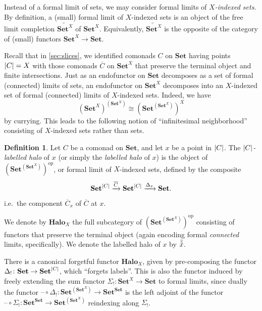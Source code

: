\documentclass[11pt, oneside, article]{memoir}
\theoremstyle{plain}
\theoremstyle{definition}
\newtheorem{definition}[def]{Definition}
\theoremstyle{remark}
\DeclareMathOperator{\ophelper}{op}
\DeclarePairedDelimiter{\abs}{\lvert}{\rvert}
\newcommand{\dash}{{\mathord{\text{--}}}}
\newcommand{\op}{^{\ophelper}}
\newcommand{\xto}[1]{\xrightarrow{#1}}
\newcommand{\bang}{\mathrm{!}}
\newcommand{\namedcat}[1]{\mathbf{#1}}
\newcommand{\Halo}{\namedcat{Halo}}
\newcommand{\LHalo}[1]{\Halo_{#1}}
\newcommand{\Set}{\namedcat{Set}}
\newcommand{\clift}[1]{\overline{#1}}
\newcommand{\pts}[1]{{\abs{#1}}}
\newcommand{\lhalo}[1]{\accentset{\overline{\circ}}{#1}}
\newcommand{\reindex}[1]{\Delta_{#1}}
\newcommand{\slicel}{\Sigma_\bang}
\newcommand{\slicer}{\Delta_\bang}
\newcommand{\fun}[2]{{#2}^{#1}}
\newcommand{\End}[1]{\fun{#1}{#1}}
\newcommand{\SetSet}{\End{\Set}}
\newcommand{\cmnd}[1]{{#1}}
\newcommand{\xX}{X}
\newcommand{\cC}{\cmnd{C}}
\newcommand{\SetpC}{\Set^\pts{\cC}}
\begin{document}
Instead of a formal limit of sets, we may consider formal limits of
\emph{$\xX$-indexed sets}. By definition, a (small) formal limit of
$\xX$-indexed sets is an object of the free limit completion
$\widetilde{\Set^X}$ of $\Set^X$. Equivalently, $\widetilde{\Set^X}$
is the opposite of the category of (small) functors $\Set^X \to \Set$.

Recall that in \cref{sec:slices}, we identified comonads $\cC$ on
$\Set$ having points $\pts{\cC} = X$ with those comonads $\clift{\cC}$ on
$\Set^X$ that preserve the terminal object and finite
intersections. Just as an endofunctor on $\Set$ decomposes as a set of
formal (connected) limits of sets, an endofunctor on $\Set^\xX$
decomposes into an $\xX$-indexed set of formal (connected) limits of
$\xX$-indexed sets. Indeed, we have
\[\fun{(\Set^\xX)}{(\Set^\xX)} \cong (\fun{(\Set^\xX)}{\Set})^X\]
by currying. This leads to the following notion of ``infinitesimal
neighborhood'' consisting of $\xX$-indexed sets rather than sets.

\begin{definition}\label{rem:labelledhalo}
  Let $\cC$ be a comonad on $\Set$, and let $x$ be a point in
  $\pts{\cC}$. The \emph{$\pts{\cC}$-labelled halo} of $x$ (or simply
  the \emph{labelled halo} of $x$) is the object of
  $(\fun{(\Set^\xX)}{\Set})\op$, or formal limit of $\xX$-indexed
  sets, defined by the composite
  \[
    \SetpC \xto{\clift{\cC}} \SetpC \xto{\reindex{x}} \Set.
  \]
  i.e.\ the component $\clift{\cC}_x$ of $\clift{\cC}$ at $x$.

  We denote by $\LHalo{X}$ the full subcategory of
  $(\fun{(\Set^\xX)}{\Set})\op$ consisting of functors that preserve the
  terminal object (again encoding formal \emph{connected} limits,
  specifically). We denote the labelled halo of $x$ by $\lhalo{x}$.
\end{definition}

There is a canonical forgetful functor $\LHalo{\xX}$, given by
pre-composing the functor $\slicer \colon \Set \to \SetpC$, which
``forgets labels''.  This is also the functor induced by freely
extending the sum functor $\slicel \colon \Set^X \to \Set$ to formal
limits, since dually the functor
$\dash \circ \slicer \colon \fun{(\Set^X)}{\Set} \to \SetSet$ is the
left adjoint of the functor
$\dash \circ \slicel \colon \SetSet \to \fun{(\Set^X)}{\Set}$
reindexing along $\slicel$.
\end{document}
